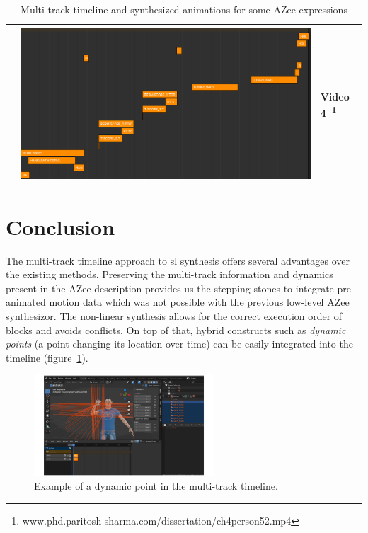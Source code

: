 \documentclass[../../main.tex]{subfiles}
\begin{document}
\begin{table}[H]
\begin{tabular}{|c|p{4.5cm}|p{2cm}|}
{        } & \includegraphics[width=\linewidth]{chapters/multi_track/images/result_ch4_persone_age_52_timeline.png} & Video 4~\footnote{www.phd.paritosh-sharma.com/dissertation/ch4person52.mp4} \\
        \hline
    \end{tabular}
    \caption{Multi-track timeline and synthesized animations for some AZee expressions}
    \label{tab:azee_to_blender}
\end{table}

\section{Conclusion}
\label{ch:multi_track:conclusion}

The multi-track timeline approach to \gls{sl} synthesis offers several advantages over the existing methods. Preserving the multi-track information and dynamics present in the AZee description provides us the stepping stones to integrate pre-animated motion data which was not possible with the previous low-level AZee synthesizor. The non-linear synthesis allows for the correct execution order of blocks and avoids conflicts. On top of that, hybrid constructs such as \emph{dynamic points} (a point changing its location over time) can be easily integrated into the timeline (figure~\ref{fig:dynpoint_example}).

\begin{figure}[h]
    \centering
    \includegraphics[width=0.6\textwidth]{chapters/multi_track/images/dynpoint_example.png}
    \caption{Example of a dynamic point in the multi-track timeline.}
    \label{fig:dynpoint_example}
\end{figure}
\end{document}
